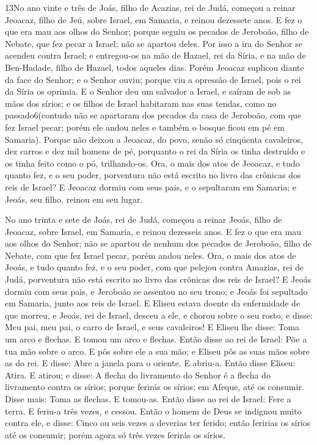\medskip

\lettrine{13} No ano vinte e três de Joás, filho de Acazias,
rei de Judá, começou a reinar Jeoacaz, filho de Jeú, sobre Israel,
em Samaria, e reinou dezessete anos. E fez o que era mau aos
olhos do Senhor; porque seguiu os pecados de Jeroboão, filho de
Nebate, que fez pecar a Israel; não se apartou deles. Por isso a
ira do Senhor se acendeu contra Israel; e entregou-os na mão de
Hazael, rei da Síria, e na mão de Ben-Hadade, filho de Hazael, todos
aqueles dias. Porém Jeoacaz suplicou diante da face do Senhor; e
o Senhor ouviu; porque viu a opressão de Israel, pois o rei da Síria
os oprimia. E o Senhor deu um salvador a Israel, e saíram de sob
as mãos dos sírios; e os filhos de Israel habitaram nas suas tendas,
como no passado6(contudo não se apartaram dos pecados da casa de
Jeroboão, com que fez Israel pecar; porém ele andou neles e também o
bosque ficou em pé em Samaria). Porque não deixou a Jeoacaz, do
povo, senão só cinqüenta cavaleiros, dez carros e dez mil homens de
pé, porquanto o rei da Síria os tinha destruído e os tinha feito
como o pó, trilhando-os. Ora, o mais dos atos de Jeoacaz, e tudo
quanto fez, e o seu poder, porventura não está escrito no livro das
crônicas dos reis de Israel? E Jeoacaz dormiu com seus pais, e o
sepultaram em Samaria; e Jeoás, seu filho, reinou em seu lugar.

No ano trinta e sete de Joás, rei de Judá, começou a reinar
Jeoás, filho de Jeoacaz, sobre Israel, em Samaria, e reinou
dezesseis anos. E fez o que era mau aos olhos do Senhor; não
se apartou de nenhum dos pecados de Jeroboão, filho de Nebate, com
que fez Israel pecar, porém andou neles. Ora, o mais dos atos
de Jeoás, e tudo quanto fez, e o seu poder, com que pelejou contra
Amazias, rei de Judá, porventura não está escrito no livro das
crônicas dos reis de Israel? E Jeoás dormiu com seus pais, e
Jeroboão se assentou no seu trono; e Jeoás foi sepultado em Samaria,
junto aos reis de Israel. E Eliseu estava doente da
enfermidade de que morreu, e Jeoás, rei de Israel, desceu a ele, e
chorou sobre o seu rosto, e disse: Meu pai, meu pai, o carro de
Israel, e seus cavaleiros! E Eliseu lhe disse: Toma um arco e
flechas. E tomou um arco e flechas. Então disse ao rei de
Israel: Põe a tua mão sobre o arco. E pôs sobre ele a sua mão; e
Eliseu pôs as suas mãos sobre as do rei. E disse: Abre a
janela para o oriente. E abriu-a. Então disse Eliseu: Atira. E
atirou; e disse: A flecha do livramento do Senhor é a flecha do
livramento contra os sírios; porque ferirás os sírios; em Afeque,
até os consumir. Disse mais: Toma as flechas. E tomou-as.
Então disse ao rei de Israel: Fere a terra. E feriu-a três vezes, e
cessou. Então o homem de Deus se indignou muito contra ele, e
disse: Cinco ou seis vezes a deverias ter ferido; então feririas os
sírios até os consumir; porém agora só três vezes ferirás os sírios.

